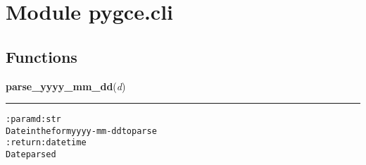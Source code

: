 %
%
%


\section{Module pygce.cli}

    \label{pygce:cli}


  \subsection{Functions}

    \label{pygce:cli:parse_yyyy_mm_dd}

    \vspace{0.5ex}

\hspace{.8\funcindent}\begin{boxedminipage}{\funcwidth}

    \raggedright \textbf{parse\_yyyy\_mm\_dd}(\textit{d})

    \vspace{-1.5ex}

    \rule{\textwidth}{0.5\fboxrule}
\setlength{\parskip}{2ex}
\begin{alltt}

:param d: str
    Date in the form yyyy-mm-dd to parse
:return: datetime
    Date parsed
\end{alltt}

\setlength{\parskip}{1ex}
    \end{boxedminipage}

    \label{pygce:cli:create_args}

